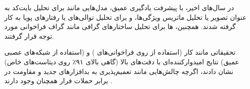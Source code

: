 در سال‌های اخیر، با پیشرفت یادگیری عمیق، مدل‌هایی مانند  برای تحلیل بایت‌کد به عنوان تصویر یا تحلیل ماتریس ویژگی‌ها، و  برای تحلیل توالی‌های  یا رفتارهای پویا به کار گرفته شدند. همچنین، ها برای تحلیل ساختارهای گرافی مانند گراف فراخوانی مورد توجه قرار گرفتند.

تحقیقاتی مانند کار  (استفاده از  روی فراخوانی‌های ) و  (استفاده از شبکه‌های عصبی عمیق) نتایج امیدوارکننده‌ای با دقت‌های بالا (گاهی بالای ۹۱٪ روی دیتاست‌های خاص) نشان دادند، اگرچه چالش‌هایی مانند تعمیم‌پذیری به بدافزارهای جدید و مقاومت در برابر حملات فرار همچنان وجود دارند \cite{Demontis2017}.

























